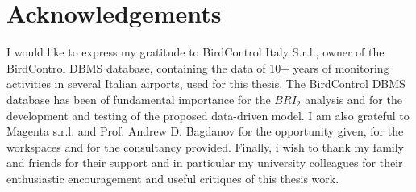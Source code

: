 \chapter*{Acknowledgements}

I would like to express my gratitude to BirdControl Italy S.r.l., owner of the BirdControl DBMS database, containing the data of 10+ years of monitoring activities in several Italian airports, used for this thesis.
The BirdControl DBMS database has been of fundamental importance for the $BRI_2$ analysis and for the development and testing of the proposed data-driven model. 
I am also grateful to Magenta s.r.l. and Prof. Andrew D. Bagdanov for the opportunity given, for the workspaces and for the consultancy provided.
Finally, i wish to thank my family and friends for their support and in particular my university colleagues for their enthusiastic encouragement and useful critiques of this thesis work.

